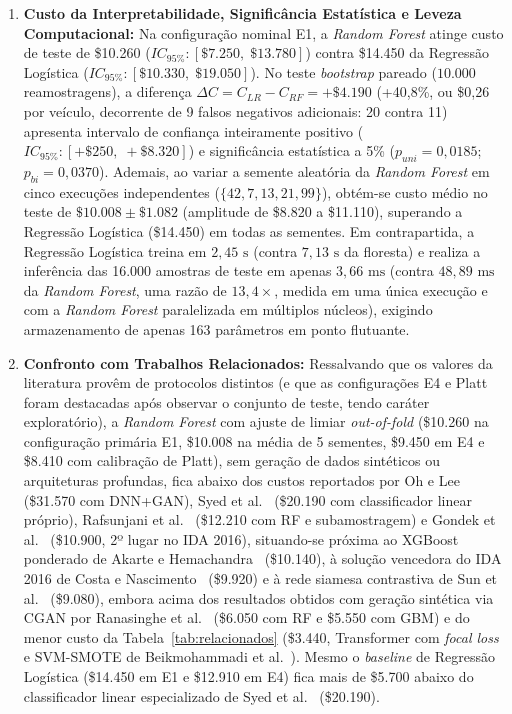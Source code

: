 \documentclass[conference]{IEEEtran}
\begin{document}
\begin{enumerate}
    \item \textbf{Custo da Interpretabilidade, Significância Estatística e Leveza Computacional:} Na configuração nominal E1, a \textit{Random Forest} atinge custo de teste de \$10.260 ($IC_{95\%}: [\$7.250,\; \$13.780]$) contra \$14.450 da Regressão Logística ($IC_{95\%}: [\$10.330,\; \$19.050]$). No teste \textit{bootstrap} pareado ($10.000$ reamostragens), a diferença $\Delta C = C_{LR} - C_{RF} = +\$4.190$ (+40,8\%, ou \$0,26 por veículo, decorrente de 9 falsos negativos adicionais: 20 contra 11) apresenta intervalo de confiança inteiramente positivo ($IC_{95\%}: [+\$250,\; +\$8.320]$) e significância estatística a 5\% ($p_{uni} = 0{,}0185$; $p_{bi} = 0{,}0370$). Ademais, ao variar a semente aleatória da \textit{Random Forest} em cinco execuções independentes ($\{42, 7, 13, 21, 99\}$), obtém-se custo médio no teste de $\$10.008 \pm \$1.082$ (amplitude de \$8.820 a \$11.110), superando a Regressão Logística (\$14.450) em todas as sementes. Em contrapartida, a Regressão Logística treina em $2{,}45\text{ s}$ (contra $7{,}13\text{ s}$ da floresta) e realiza a inferência das 16.000 amostras de teste em apenas $3{,}66\text{ ms}$ (contra $48{,}89\text{ ms}$ da \textit{Random Forest}, uma razão de $13{,}4\times$, medida em uma única execução e com a \textit{Random Forest} paralelizada em múltiplos núcleos), exigindo armazenamento de apenas 163 parâmetros em ponto flutuante.
    \item \textbf{Confronto com Trabalhos Relacionados:} Ressalvando que os valores da literatura provêm de protocolos distintos (e que as configurações E4 e Platt foram destacadas após observar o conjunto de teste, tendo caráter exploratório), a \textit{Random Forest} com ajuste de limiar \textit{out-of-fold} (\$10.260 na configuração primária E1, \$10.008 na média de 5 sementes, \$9.450 em E4 e \$8.410 com calibração de Platt), sem geração de dados sintéticos ou arquiteturas profundas, fica abaixo dos custos reportados por Oh e Lee~\cite{oh2020} (\$31.570 com DNN+GAN), Syed et al.~\cite{syed2020} (\$20.190 com classificador linear próprio), Rafsunjani et al.~\cite{rafsunjani2019} (\$12.210 com RF e subamostragem) e Gondek et al.~\cite{gondek2016prediction} (\$10.900, 2º lugar no IDA 2016), situando-se próxima ao XGBoost ponderado de Akarte e Hemachandra~\cite{akarte2018} (\$10.140), à solução vencedora do IDA 2016 de Costa e Nascimento~\cite{costa2016ida} (\$9.920) e à rede siamesa contrastiva de Sun et al.~\cite{sun2023} (\$9.080), embora acima dos resultados obtidos com geração sintética via CGAN por Ranasinghe et al.~\cite{ranasinghe2019} (\$6.050 com RF e \$5.550 com GBM) e do menor custo da Tabela~\ref{tab:relacionados} (\$3.440, Transformer com \textit{focal loss} e SVM-SMOTE de Beikmohammadi et al.~\cite{costtransformer2024}). Mesmo o \textit{baseline} de Regressão Logística (\$14.450 em E1 e \$12.910 em E4) fica mais de \$5.700 abaixo do classificador linear especializado de Syed et al.~\cite{syed2020} (\$20.190).
\end{enumerate}
\end{document}
